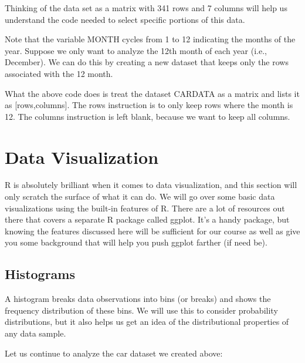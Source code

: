\documentclass[
]{book}
\newenvironment{Shaded}{\begin{snugshade}}{\end{snugshade}}
\newcommand{\DecValTok}[1]{\textcolor[rgb]{0.00,0.00,0.81}{#1}}
\newcommand{\NormalTok}[1]{#1}
\newcommand{\OtherTok}[1]{\textcolor[rgb]{0.56,0.35,0.01}{#1}}
\newcommand{\SpecialCharTok}[1]{\textcolor[rgb]{0.00,0.00,0.00}{#1}}
\begin{document}
Thinking of the data set as a matrix with 341 rows and 7 columns will help us understand the code needed to select specific portions of this data.

Note that the variable MONTH cycles from 1 to 12 indicating the months of the year. Suppose we only want to analyze the 12th month of each year (i.e., December). We can do this by creating a new dataset that keeps only the rows associated with the 12 month.

\begin{Shaded}
\end{Shaded}

What the above code does is treat the dataset CARDATA as a matrix and lists it as {[}rows,columns{]}. The rows instruction is to only keep rows where the month is 12. The columns instruction is left blank, because we want to keep all columns.

\hypertarget{data-visualization}{%
\section{Data Visualization}\label{data-visualization}}

R is absolutely brilliant when it comes to data visualization, and this section will only scratch the surface of what it can do. We will go over some basic data visualizations using the built-in features of R. There are a lot of resources out there that covers a separate R package called ggplot. It's a handy package, but knowing the features discussed here will be sufficient for our course as well as give you some background that will help you push ggplot farther (if need be).

\hypertarget{histograms}{%
\subsection{Histograms}\label{histograms}}

A histogram breaks data observations into bins (or breaks) and shows the frequency distribution of these bins. We will use this to consider probability distributions, but it also helps us get an idea of the distributional properties of any data sample.

Let us continue to analyze the car dataset we created above:
\end{document}
